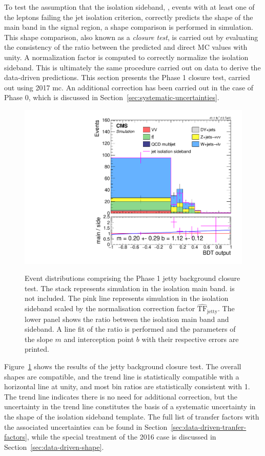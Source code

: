 To test the assumption that the isolation sideband, \ie, events with at least one of the leptons failing the jet isolation criterion, correctly predicts the shape of the main band in the signal region, a shape comparison is performed in simulation. This shape comparison, also known as a \emph{closure test}, is carried out by evaluating the consistency of the ratio between the predicted and direct MC values with unity. A normalization factor is computed to correctly normalize the isolation sideband. This is ultimately the same procedure carried out on data to derive the data-driven predictions. This section presents the Phase 1 closure test, carried out using 2017 \gls{mc}. An additional correction has been carried out in the case of Phase 0, which is discussed in Section~\ref{sec:systematic-uncertainties}.

\begin{figure}[!htb]
\centering
\includegraphics[width=0.60\linewidth]{plots/dilepton_muons_2017_closure/none_closure_dilepBDTphase1CorrJetNoMultIso10Dr0.6.pdf}  \\


\caption[Event distributions comprising the Phase 1 jetty background closure test.]{Event distributions comprising the Phase 1 jetty background closure test. The stack represents simulation in the isolation main band. \ztautau is not included. The pink line represents simulation in the isolation sideband scaled by the normalisation correction factor $\hat{\mathrm{TF}}_{\text{jetty}}$. The lower panel shows the ratio between the isolation main band and sideband. A line fit of the ratio is performed and the parameters of the slope $m$ and interception point $b$ with their respective errors are printed.}
\label{fig:dimuon-bdt-jetty-2017-closure}
\end{figure}

Figure~\ref{fig:dimuon-bdt-jetty-2017-closure} shows the results of the jetty background closure test. The overall shapes are compatible, and the trend line is statistically compatible with a horizontal line at unity, and most bin ratios are statistically consistent with 1. The trend line indicates there is no need for additional correction, but the uncertainty in the trend line constitutes the basis of a systematic uncertainty in the shape of the isolation sideband template. The full list of transfer factors with the associated uncertainties can be found in Section~\ref{sec:data-driven-tranfer-factors}, while the special treatment of the 2016 case is discussed in Section~\ref{sec:data-driven-shape}.

